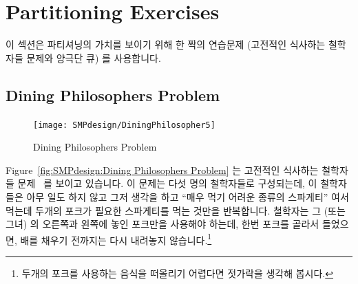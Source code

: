 
\section{Partitioning Exercises}
\label{sec:SMPdesign:Partitioning Exercises}

이 섹션은 파티셔닝의 가치를 보이기 위해 한 짝의 연습문제 (고전적인 식사하는
철학자들 문제와 양극단 큐) 를 사용합니다.

\subsection{Dining Philosophers Problem}
\label{sec:SMPdesign:Dining Philosophers Problem}

\begin{figure}[tb]
\begin{center}
\texttt{[image: SMPdesign/DiningPhilosopher5]}
\end{center}
\caption{Dining Philosophers Problem}
\end{figure}

Figure~\ref{fig:SMPdesign:Dining Philosophers Problem} 는 고전적인 식사하는
철학자들 문제~\cite{Dijkstra1971HOoSP} 를 보이고 있습니다.
이 문제는 다섯 명의 철학자들로 구성되는데, 이 철학자들은 아무 일도 하지 않고
그저 생각을 하고 ``매우 먹기 어려운 종류의 스파게티'' 여서 먹는데 두개의 포크가
필요한 스파게티를 먹는 것만을 반복합니다.
철학자는 그 (또는 그녀) 의 오른쪽과 왼쪽에 놓인 포크만을 사용해야 하는데, 한번
포크를 골라서 들었으면, 배를 채우기 전까지는 다시 내려놓지 않습니다.\footnote{
	두개의 포크를 사용하는 음식을 떠올리기 어렵다면 젓가락을 생각해
	봅시다.}

